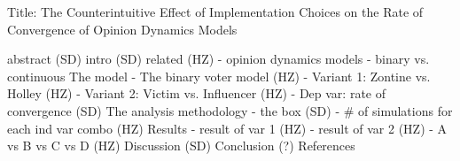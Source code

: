 

Title:
The Counterintuitive Effect of Implementation Choices on the Rate of
Convergence of Opinion Dynamics Models



abstract (SD)
intro (SD)
related (HZ)
    - opinion dynamics models
    - binary vs. continuous
The model
    - The binary voter model (HZ)
    - Variant 1: Zontine vs. Holley (HZ)
    - Variant 2: Victim vs. Influencer (HZ)
    - Dep var: rate of convergence (SD)
The analysis methodology
    - the box (SD)
    - # of simulations for each ind var combo (HZ)
Results
    - result of var 1 (HZ)
    - result of var 2 (HZ)
    - A vs B vs C vs D (HZ)
Discussion (SD)
Conclusion (?)
References

